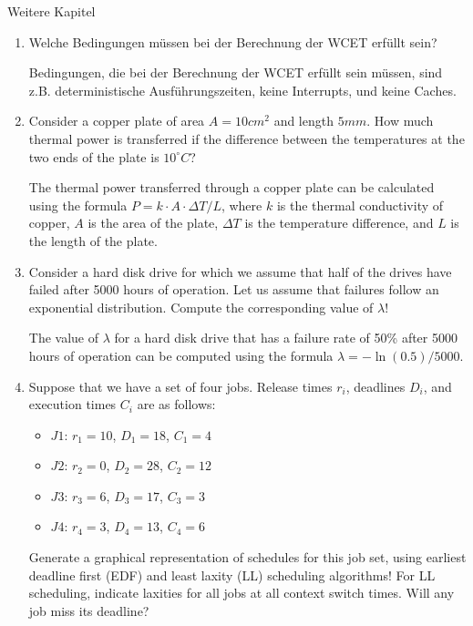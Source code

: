 \documentclass{article}
\begin{document}
\begin{exercise}{Weitere Kapitel}
  \begin{enumerate}
    \item Welche Bedingungen müssen bei der Berechnung der WCET erfüllt sein?

          \begin{solution}
            Bedingungen, die bei der Berechnung der WCET erfüllt sein müssen, sind z.B. deterministische Ausführungszeiten, keine Interrupts, und keine Caches.
          \end{solution}

    \item Consider a copper plate of area $A=10cm^2$ and length $5mm$. How much thermal power is transferred if the difference between the temperatures at the two ends of the plate is $10^\circ C$?

          \begin{solution}
            The thermal power transferred through a copper plate can be calculated using the formula $P = k \cdot A \cdot \Delta T / L$, where $k$ is the thermal conductivity of copper, $A$ is the area of the plate, $\Delta T$ is the temperature difference, and $L$ is the length of the plate.
          \end{solution}

    \item Consider a hard disk drive for which we assume that half of the drives have failed after 5000 hours of operation. Let us assume that failures follow an exponential distribution. Compute the corresponding value of $\lambda$!

          \begin{solution}
            The value of $\lambda$ for a hard disk drive that has a failure rate of 50\% after 5000 hours of operation can be computed using the formula $\lambda = -\ln(0.5) / 5000$.
          \end{solution}

    \item Suppose that we have a set of four jobs. Release times $r_i$, deadlines $D_i$, and execution times $C_i$ are as follows:
          \begin{itemize}
            \item $J1$: $r_1=10$, $D_1=18$, $C_1=4$
            \item $J2$: $r_2=0$, $D_2=28$, $C_2=12$
            \item $J3$: $r_3=6$, $D_3=17$, $C_3=3$
            \item $J4$: $r_4=3$, $D_4=13$, $C_4=6$
          \end{itemize}
          Generate a graphical representation of schedules for this job set, using earliest deadline first (EDF) and least laxity (LL) scheduling algorithms! For LL scheduling, indicate laxities for all jobs at all context switch times. Will any job miss its deadline?


\end{enumerate}
\end{exercise}
\end{document}
